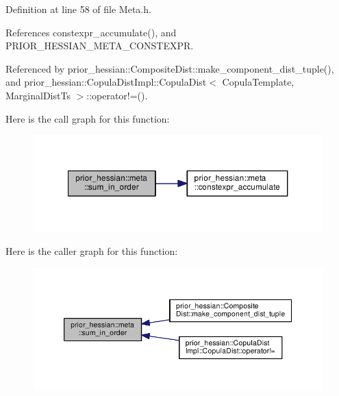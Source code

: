 Definition at line 58 of file Meta.\+h.



References constexpr\+\_\+accumulate(), and P\+R\+I\+O\+R\+\_\+\+H\+E\+S\+S\+I\+A\+N\+\_\+\+M\+E\+T\+A\+\_\+\+C\+O\+N\+S\+T\+E\+X\+PR.



Referenced by prior\+\_\+hessian\+::\+Composite\+Dist\+::make\+\_\+component\+\_\+dist\+\_\+tuple(), and prior\+\_\+hessian\+::\+Copula\+Dist\+Impl\+::\+Copula\+Dist$<$ Copula\+Template, Marginal\+Dist\+Ts $>$\+::operator!=().



Here is the call graph for this function\+:\nopagebreak
\begin{figure}[H]
\begin{center}
\leavevmode
\includegraphics[width=327pt]{namespaceprior__hessian_1_1meta_ab09470f06d05f5c58e249a03ef19242f_cgraph}
\end{center}
\end{figure}




Here is the caller graph for this function\+:\nopagebreak
\begin{figure}[H]
\begin{center}
\leavevmode
\includegraphics[width=350pt]{namespaceprior__hessian_1_1meta_ab09470f06d05f5c58e249a03ef19242f_icgraph}
\end{center}
\end{figure}


